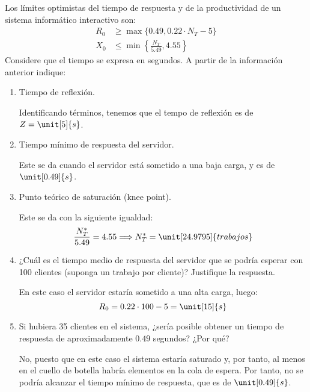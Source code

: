 \begin{ejercicio}\label{ej:5.18}
    Los límites optimistas del tiempo de respuesta y de la productividad de un sistema informático interactivo son:
    \begin{align*}
        R_0 &\geq \max\{0.49, 0.22 \cdot N_T - 5\} \\
        X_0 &\leq \min\left\{\frac{N_T}{5.49}, 4.55\right\}
    \end{align*}
    Considere que el tiempo se expresa en segundos. A partir de la información anterior indique:
    \begin{enumerate}
        \item Tiempo de reflexión.
        
        Identificando términos, tenemos que el tempo de reflexión es de $Z=\unit[5]{s}$.
        \item Tiempo mínimo de respuesta del servidor.
        
        Este se da cuando el servidor está sometido a una baja carga, y es de $\unit[0.49]{s}$.
        \item Punto teórico de saturación (knee point).
        
        Este se da con la siguiente igualdad:
        \begin{equation*}
            \dfrac{N_T^*}{5.49}=4.55
            \Longrightarrow N_T^*=\unit[24.9795]{trabajos}
        \end{equation*}
        \item ¿Cuál es el tiempo medio de respuesta del servidor que se podría esperar con 100 clientes (suponga un trabajo por cliente)? Justifique la respuesta.
        
        En este caso el servidor estaría sometido a una alta carga, luego:
        \begin{equation*}
            R_0 = 0.22\cdot 100-5 = \unit[15]{s}
        \end{equation*}
        \item Si hubiera 35 clientes en el sistema, ¿sería posible obtener un tiempo de respuesta de aproximadamente $0.49$ segundos? ¿Por qué?
        
        No, puesto que en este caso el sistema estaría saturado y, por tanto, al menos en el cuello de botella habría elementos en la cola de espera. Por tanto, no se podría alcanzar el tiempo mínimo de respuesta, que es de $\unit[0.49]{s}$.
    \end{enumerate}
\end{ejercicio}

